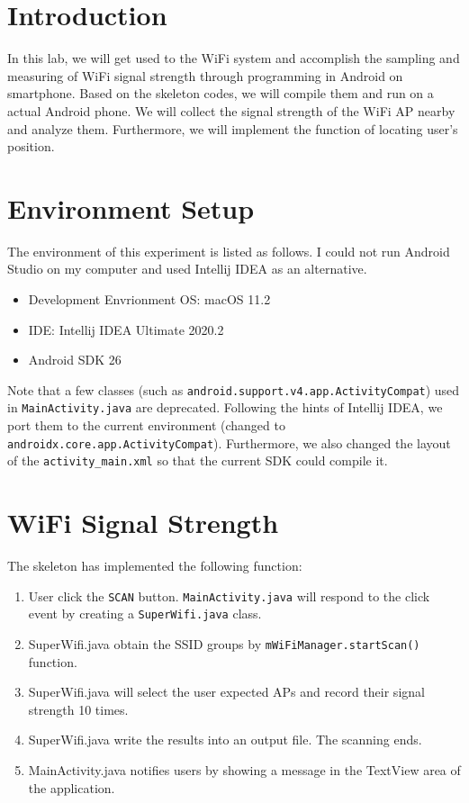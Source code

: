 \section{Introduction}

In this lab, we will get used to the WiFi system and accomplish the sampling and measuring of WiFi signal strength through programming in Android on smartphone. Based on the skeleton codes, we will compile them and run on a actual Android phone. We will collect the signal strength of the WiFi AP nearby and analyze them. Furthermore, we will implement the function of locating user's position.

\section{Environment Setup}

The environment of this experiment is listed as follows. I could not run Android Studio on my computer and used Intellij IDEA as an alternative.

\begin{itemize}
  \item Development Envrionment OS: macOS 11.2
  \item IDE: Intellij IDEA Ultimate 2020.2
  \item Android SDK 26
\end{itemize}

Note that a few classes (such as \texttt{android.support.v4.app.ActivityCompat}) used in \texttt{MainActivity.java} are deprecated. Following the hints of Intellij IDEA, we port them to the current environment (changed to \texttt{androidx.core.app.ActivityCompat}). Furthermore, we also changed the layout of the \texttt{activity\_main.xml} so that the current SDK could compile it.


\section{WiFi Signal Strength}

The skeleton has implemented the following function:
\begin{enumerate}
  \item User click the \texttt{SCAN} button. \texttt{MainActivity.java} will respond to the click event by creating a \texttt{SuperWifi.java} class.
  \item {SuperWifi.java} obtain the SSID groups by \texttt{mWiFiManager.startScan()} function.
  \item {SuperWifi.java} will select the user expected APs and record their signal strength 10 times.
  \item {SuperWifi.java} write the results into an output file. The scanning ends.
  \item {MainActivity.java} notifies users by showing a message in the TextView area of the application.
\end{enumerate}

